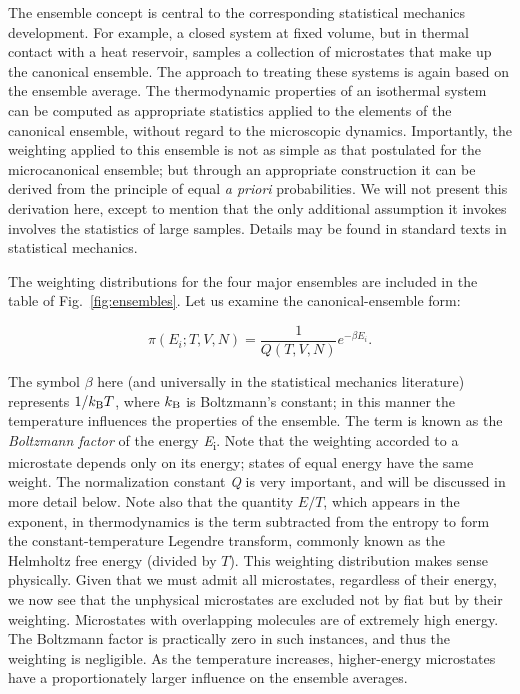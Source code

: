 \documentclass[]{article}
\begin{document}
The ensemble concept is central to the corresponding statistical
mechanics development. For example, a closed system at fixed volume, but
in thermal contact with a heat reservoir, samples a collection of
microstates that make up the canonical ensemble. The approach to
treating these systems is again based on the ensemble average. The
thermodynamic properties of an isothermal system can be computed as
appropriate statistics applied to the elements of the canonical
ensemble, without regard to the microscopic dynamics. Importantly, the
weighting applied to this ensemble is not as simple as that postulated
for the microcanonical ensemble; but through an appropriate construction
it can be derived from the principle of equal \emph{a priori}
probabilities. We will not present this derivation here, except to
mention that the only additional assumption it invokes involves the
statistics of large samples. Details may be found in standard texts in
statistical mechanics.

The weighting distributions for the four major ensembles are included in
the table of Fig.~\ref{fig:ensembles}. Let us examine the canonical-ensemble form:

\[\pi \left( {{E_i};T,V,N} \right) = \frac{1}{{Q(T,V,N)}}{e^{ - \beta {E_i}}}.\]

The symbol $\beta$ here (and universally in the statistical mechanics
literature) represents $1/k_{\rm B}T$, where $k_{\rm B}$ is Boltzmann's constant; in this
manner the temperature influences the properties of the ensemble. The
term is known as the \emph{Boltzmann factor} of the energy
\emph{E}\textsubscript{i}. Note that the weighting accorded to a
microstate depends only on its energy; states of equal energy have the
same weight. The normalization constant \emph{Q} is very important, and
will be discussed in more detail below. Note also that the quantity $E/T$,
which appears in the exponent, in thermodynamics is the term subtracted
from the entropy to form the constant-temperature Legendre transform,
commonly known as the Helmholtz free energy (divided by $T$). This
weighting distribution makes sense physically. Given that we must admit
all microstates, regardless of their energy, we now see that the
unphysical microstates are excluded not by fiat but by their weighting.
Microstates with overlapping molecules are of extremely high energy. The
Boltzmann factor is practically zero in such instances, and thus the
weighting is negligible. As the temperature increases, higher-energy
microstates have a proportionately larger influence on the ensemble
averages.
\end{document}
